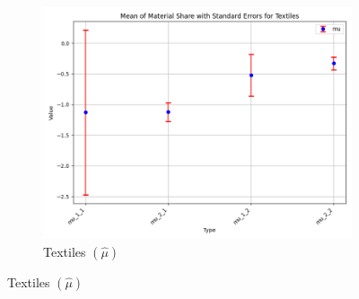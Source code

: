 \documentclass{article}
\begin{document}
\begin{figure}[ht!]
\begin{subfigure}[t]{0.32\textwidth}
        \includegraphics[width=\textwidth]{figure/empirical_ar1_mixture_mu_with_error_bars_Textiles.png}
        \caption{Textiles $(\hat\mu)$}
    \end{subfigure}


\end{figure}
\end{document}
